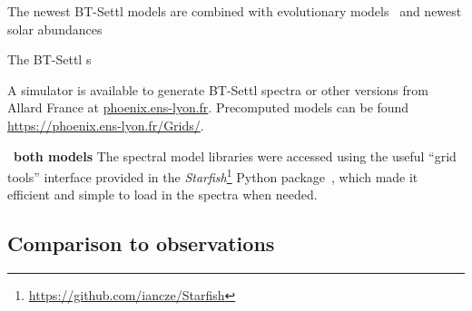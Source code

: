 The newest {BT-Settl} models are combined with evolutionary models~\citep{barrafe_new_2015} and newest   solar abundances



The {BT-Settl} s

A simulator is available to generate {BT-Settl} spectra or other  versions from Allard France at \href{phoenix.ens-lyon.fr}{phoenix.ens-lyon.fr}.
Precomputed models can be found \href{https://phoenix.ens-lyon.fr/Grids/}{https://phoenix.ens-lyon.fr/Grids/}.


\ \textbf{both models}
The spectral model libraries were accessed using the useful ``grid tools'' interface provided in the \emph{Starfish}\footnote{\url{https://github.com/iancze/Starfish}} Python package~\citep{czekala_constructing_2015}, which made it efficient and simple to load in the spectra when needed.

\subsection{Comparison to observations}
